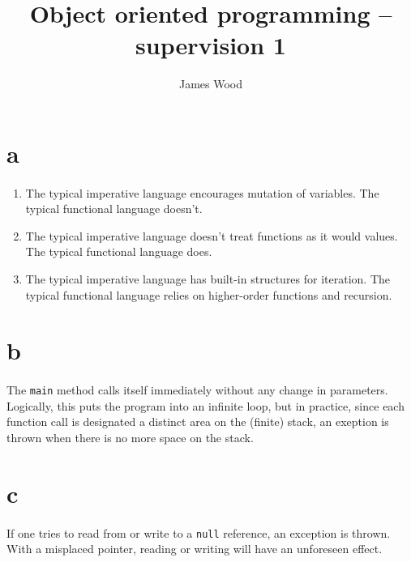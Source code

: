\documentclass[11pt]{article}
\title{\textbf{Object oriented programming -- supervision 1}}
\author{James Wood}
\begin{document}
\maketitle

\section*{a}
\paragraph{}\begin{enumerate}
  \item The typical imperative language encourages mutation of variables. The typical functional language doesn't.
  \item The typical imperative language doesn't treat functions as it would values. The typical functional language does.
  \item The typical imperative language has built-in structures for iteration. The typical functional language relies on higher-order functions and recursion.
\end{enumerate}

\section*{b}
\paragraph{}
\paragraph{}The \texttt{main} method calls itself immediately without any change in parameters. Logically, this puts the program into an infinite loop, but in practice, since each function call is designated a distinct area on the (finite) stack, an exeption is thrown when there is no more space on the stack.

\section*{c}
\paragraph{}If one tries to read from or write to a \texttt{null} reference, an exception is thrown. With a misplaced pointer, reading or writing will have an unforeseen effect.
\end{document}
